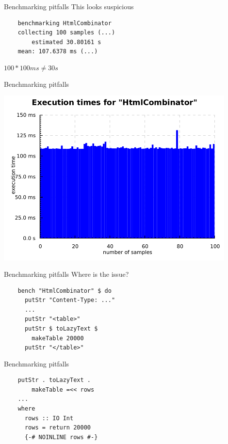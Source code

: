 \documentclass[20pt]{beamer}
\newcommand{\vspaced}{
    \vspace{5mm}
}
\begin{document}
\begin{frame}[fragile]{Benchmarking pitfalls}
    This looks suspicious \\
    \vspaced
    \begin{lstlisting}
    benchmarking HtmlCombinator
    collecting 100 samples (...)
        estimated 30.80161 s
    mean: 107.6378 ms (...)
    \end{lstlisting}
    \vspaced
    $100 * 100ms \neq 30s$
\end{frame}

\begin{frame}{Benchmarking pitfalls}
    \begin{center}
    \includegraphics[width=0.9\textwidth]{images/htmlcombinator.pdf}
    \end{center}
\end{frame}

\begin{frame}[fragile]{Benchmarking pitfalls}
    Where is the issue? \\
    \vspaced
    \begin{lstlisting}
    bench "HtmlCombinator" $ do
      putStr "Content-Type: ..."
      ...
      putStr "<table>"
      putStr $ toLazyText $
        makeTable 20000
      putStr "</table>"
    \end{lstlisting}
\end{frame}

\begin{frame}[fragile]{Benchmarking pitfalls}
    \begin{lstlisting}
    putStr . toLazyText .
        makeTable =<< rows
    ...
    where
      rows :: IO Int
      rows = return 20000
      {-# NOINLINE rows #-}
    \end{lstlisting}
\end{frame}
\end{document}
